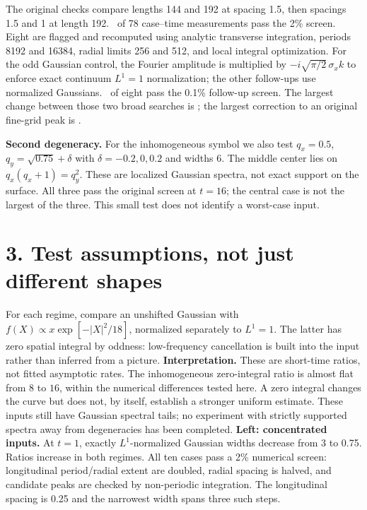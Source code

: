 The original checks compare lengths 144 and 192 at spacing 1.5, then spacings
1.5 and 1 at length 192. \ResearchPass\ of 78 case--time measurements pass the
2\% screen. Eight are flagged and recomputed using analytic transverse integration,
periods 8192 and 16384, radial limits 256 and 512, and local integral optimization. For the odd Gaussian control, the Fourier
amplitude is multiplied by $-i\sqrt{\pi/2}\,\sigma_x k$ to enforce exact continuum
$L^1=1$ normalization; the other follow-ups use normalized Gaussians.
\ResearchFollowPass\ of eight pass the 0.1\% follow-up screen. The largest change
between those two broad searches is \ResearchFollowChange; the largest correction
to an original fine-grid peak is \ResearchCorrection.

\textbf{Second degeneracy.} For the inhomogeneous symbol we also test
$q_x=0.5$, $q_y=\sqrt{0.75}+\delta$ with $\delta=-0.2,0,0.2$ and widths 6.
The middle center lies on $q_x(q_x+1)=q_y^2$. These are localized Gaussian spectra,
not exact support on the surface. All three pass the original screen at $t=16$;
the central case is not the largest of the three. This small test does not identify
a worst-case input.

\newpage
{}
\section*{3. Test assumptions, not just different shapes}
For each regime, compare an unshifted Gaussian with
$f(X)\propto x\exp[-|X|^2/18]$, normalized separately to $L^1=1$.
The latter has zero spatial integral by oddness: low-frequency cancellation is
built into the input rather than inferred from a picture.
\textbf{Interpretation.} These are short-time ratios, not fitted asymptotic rates.
The inhomogeneous zero-integral ratio is almost flat from $8$ to $16$, within
the numerical differences tested here. A zero integral changes the curve but does not, by itself, establish a stronger
uniform estimate. These inputs still have Gaussian spectral tails; no experiment
with strictly supported spectra away from degeneracies has been completed.
\textbf{Left: concentrated inputs.} At $t=1$, exactly $L^1$-normalized Gaussian
widths decrease from 3 to 0.75. Ratios increase in both regimes. All ten cases pass
a 2\% numerical screen: longitudinal period/radial extent are doubled, radial
spacing is halved, and candidate peaks are checked by non-periodic integration.
The longitudinal spacing is 0.25 and the narrowest width spans three such steps.

